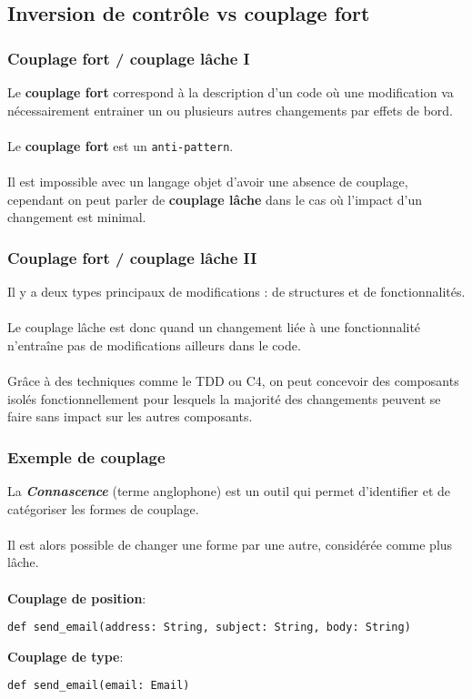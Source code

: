 \subsection{Inversion de contr\^{o}le vs couplage fort}

\begin{frame}
	\frametitle{Couplage fort / couplage l\^{a}che I}
    
 Le \textbf{couplage fort} correspond \`{a} la description d'un code o\`{u} une modification va n\'{e}cessairement entrainer un ou plusieurs autres changements par effets de bord.
 \\~\\
    Le \textbf{couplage fort} est un {\lstinline[basicstyle=\ttfamily\color{red}]|anti-pattern|}.
    \\~\\
    Il est impossible avec un langage objet d'avoir une absence de couplage, cependant on peut parler de \textbf{couplage l\^{a}che} dans le cas o\`{u} l'impact d'un changement est minimal.    
\end{frame}

\begin{frame}
	\frametitle{Couplage fort / couplage l\^{a}che II}
Il y a deux types principaux de modifications : de structures et de fonctionnalit\'{e}s.
 \\~\\
Le couplage l\^{a}che est donc quand un changement li\'{e}e \`{a} une fonctionnalit\'{e} n'entra\^{i}ne pas de modifications ailleurs dans le code.
 \\~\\
    Gr\^{a}ce \`{a} des techniques comme le TDD ou C4, on peut concevoir des composants isol\'{e}s fonctionnellement pour lesquels la majorit\'{e} des changements peuvent se faire sans impact sur les autres composants.
\end{frame}

\begin{frame}[fragile]
	\frametitle{Exemple de couplage}

    La \textit{\textbf{Connascence}} (terme anglophone) est un outil qui permet d'identifier et de cat\'{e}goriser les formes de couplage.
    \\~\\
    Il est alors possible de changer une forme par une autre, consid\'{e}r\'{e}e comme plus l\^{a}che.
    \\~\\
    \textbf{Couplage de position}:
    \begin{lstlisting}
def send_email(address: String, subject: String, body: String)
	\end{lstlisting}
    \textbf{Couplage de type}:
    \begin{lstlisting}
def send_email(email: Email)
	\end{lstlisting}
\end{frame}

